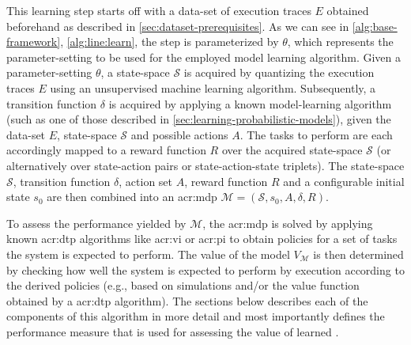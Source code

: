 This learning step starts off with a data-set of execution traces $E$ obtained beforehand as described in \autoref{sec:dataset-prerequisites}.
As we can see in \autoref{alg:base-framework}, \autoref{alg:line:learn}, the step is parameterized by $\theta$, which represents the parameter-setting to be used for the employed model learning algorithm.
Given a parameter-setting $\theta$, a state-space $\mathcal{S}$ is acquired by quantizing the execution traces $E$ using an unsupervised machine learning algorithm.
Subsequently, a transition function $\delta$ is acquired by applying a known model-learning algorithm (such as one of those described in \autoref{sec:learning-probabilistic-models}), given the data-set $E$, state-space $\mathcal{S}$ and possible actions $A$.
The tasks to perform are each accordingly mapped to a reward function $R$ over the acquired state-space $\mathcal{S}$ (or alternatively over state-action pairs or state-action-state triplets).
The state-space $\mathcal{S}$, transition function $\delta$, action set $A$, reward function $R$ and a configurable initial state $s_0$ are then combined into an \acrshort{acr:mdp} $\mathcal{M} = (\mathcal{S}, s_0, A, \delta, R)$.

To assess the performance yielded by $\mathcal{M}$, the \acrshort{acr:mdp} is solved by applying known \acrshort{acr:dtp} algorithms like \acrshort{acr:vi} or \acrshort{acr:pi} to obtain policies for a set of tasks the system is expected to perform.
The value of the model $V_{\mathcal{M}}$ is then determined by checking how well the system is expected to perform by execution according to the derived policies (e.g., based on simulations and/or the value function obtained by a \acrshort{acr:dtp} algorithm).
The sections below describes each of the components of this algorithm in more detail and most importantly defines the performance measure that is used for assessing the value of learned .


